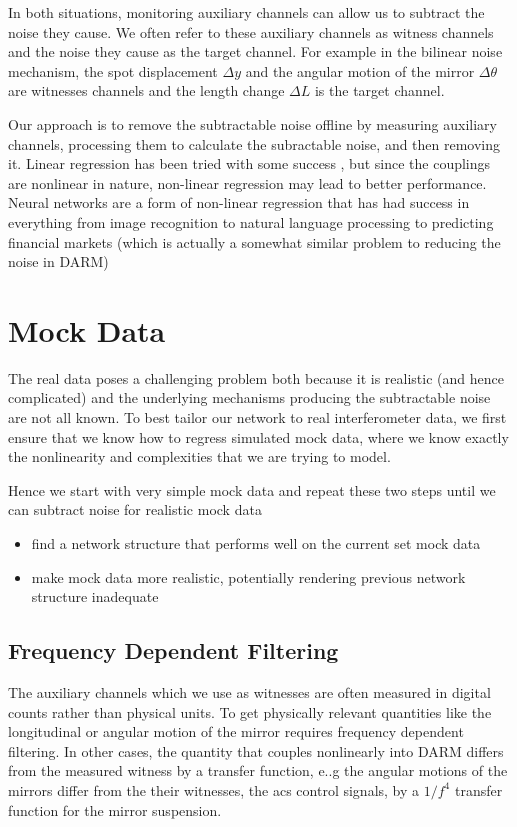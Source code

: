 \begin{refsection}
In both situations, monitoring auxiliary channels can allow us to subtract the noise they cause.  We often refer to these auxiliary channels as witness channels and the noise they cause as the target channel. For example in the bilinear noise mechanism, the spot displacement $\Delta y$ and the angular motion of the mirror $\Delta \theta$ are witnesses channels and the length change $\Delta L$ is the target channel. 

Our approach is to remove the subtractable noise offline by measuring auxiliary channels, processing them to calculate the subractable noise, and then removing it. Linear regression has been tried with some success \cite{lin_reg}, but since the couplings are nonlinear in nature, non-linear regression may lead to better performance. Neural networks are a form of non-linear regression that has had success in everything from image recognition \cite{10.1007/978-981-15-3020-3_23} to natural language processing \cite{FATHI2018229} to predicting financial markets \cite{siaminamini2018forecasting} (which is actually a somewhat similar problem to reducing the noise in DARM)

\section{Mock Data}

The real data poses a challenging problem both because it is realistic (and hence complicated) and the underlying mechanisms producing the subtractable noise are not all known. To best tailor our network to real interferometer data, we first ensure that we know how to regress simulated mock data, where we know exactly the nonlinearity and complexities that we are trying to model. 

Hence we start with very simple mock data and repeat these two steps until we can subtract noise for realistic mock data
\begin{itemize}
\item find a network structure that performs well on the current set mock data
\item make mock data more realistic, potentially rendering previous network structure inadequate
\end{itemize}

\subsection{Frequency Dependent Filtering}
The auxiliary channels which we use as witnesses are often measured in digital counts rather than physical units. To get physically relevant quantities like the longitudinal or angular motion of the mirror requires frequency dependent filtering. In other cases, the quantity that couples nonlinearly into DARM differs from the measured witness by a transfer function, e..g the angular motions of the mirrors differ from the their witnesses, the acs control signals, by a $1/f^4$ transfer function for the mirror suspension. 


\end{refsection}
